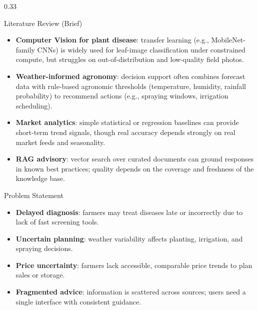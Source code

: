 \documentclass[final]{beamer}
\begin{document}
\begin{frame}[t]
\begin{columns}[t,totalwidth=\linewidth]
\begin{column}{0.33\linewidth}
\begin{block}{Literature Review (Brief)}
\begin{itemize}
  \item \textbf{Computer Vision for plant disease}: transfer learning (e.g., MobileNet-family CNNs) is widely used for leaf-image classification under constrained compute, but struggles on out-of-distribution and low-quality field photos.
  \item \textbf{Weather-informed agronomy}: decision support often combines forecast data with rule-based agronomic thresholds (temperature, humidity, rainfall probability) to recommend actions (e.g., spraying windows, irrigation scheduling).
  \item \textbf{Market analytics}: simple statistical or regression baselines can provide short-term trend signals, though real accuracy depends strongly on real market feeds and seasonality.
  \item \textbf{RAG advisory}: vector search over curated documents can ground responses in known best practices; quality depends on the coverage and freshness of the knowledge base.
\end{itemize}
\end{block}

\begin{block}{Problem Statement}
\begin{itemize}
  \item \textbf{Delayed diagnosis}: farmers may treat diseases late or incorrectly due to lack of fast screening tools.
  \item \textbf{Uncertain planning}: weather variability affects planting, irrigation, and spraying decisions.
  \item \textbf{Price uncertainty}: farmers lack accessible, comparable price trends to plan sales or storage.
  \item \textbf{Fragmented advice}: information is scattered across sources; users need a single interface with consistent guidance.
\end{itemize}
\end{block}


\end{column}
\end{columns}
\end{frame}
\end{document}

